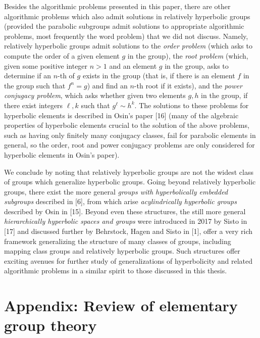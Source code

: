 \documentclass[12pt]{article}
\newcommand{\vs}{\vskip10pt}
\begin{document}
	\vs
	
	Besides the algorithmic problems presented in this paper, there are other algorithmic problems which also admit solutions in relatively hyperbolic groups (provided the parabolic subgroups admit solutions to appropriate algorithmic problems, most frequently the word problem) that we did not discuss. Namely, relatively hyperbolic groups admit solutions to the \textit{order problem} (which asks to compute the order of a given element $g$ in the group), the \textit{root problem} (which, given some positive integer $n > 1$ and an element $g$ in the group, asks to determine if an $n$-th of $g$ exists in the group (that is, if there is an element $f$ in the group such that $f^n = g$) and find an $n$-th root if it exists), and the \textit{power conjugacy problem}, which asks whether given two elements $g,h$ in the group, if there exist integers $\ell, k$ such that $g^{\ell} \sim h^k$. The solutions to these problems for hyperbolic elements is described in Osin's paper [16] (many of the algebraic properties of hyperbolic elements crucial to the solution of the above problems, such as having only finitely many conjugacy classes, fail for parabolic elements in general, so the order, root and power conjugacy problems are only considered for hyperbolic elements in Osin's paper). 
	
	\vs 
	
	We conclude by noting that relatively hyperbolic groups are not the widest class of groups which generalize hyperbolic groups. Going beyond relatively hyperbolic groups, there exist the more general \textit{groups with hyperbolically embedded subgroups} described in [6], from which arise \textit{acylindrically hyperbolic groups} described by Osin in [15]. Beyond even these structures, the still more general \textit{hierarchically hyperbolic spaces and groups} were introduced in 2017 by Sisto in [17] and discussed further by Behrstock, Hagen and Sisto in [1], offer a very rich framework generalizing the structure of many classes of groups, including mapping class groups and relatively hyperbolic groups. Such structures offer exciting avenues for further study of generalizations of hyperbolicity and related algorithmic problems in a similar spirit to those discussed in this thesis. 
	
	
	\newpage
	
	\section{Appendix: Review of elementary group theory}
	
\end{document}
